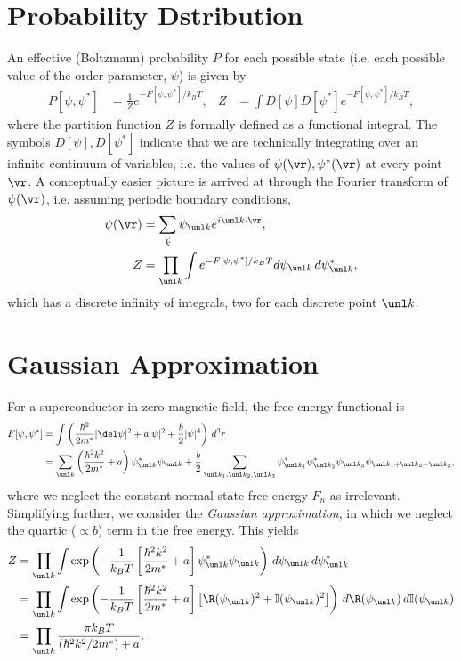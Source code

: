 \documentclass[qo.tex]{subfiles}
\begin{document}
\section{Probability Dstribution}
An effective (Boltzmann) probability $P$ for each possible state (i.e. each possible value of the order parameter, $\psi$) is given by
\begin{align}
    P[\psi,\psi^*] &= \frac{1}{Z}e^{-F[\psi,\psi^*]/k_BT}, & Z &= \int D[\psi]D[\psi^*]e^{-F[\psi,\psi^*]/k_BT},
\end{align}
where the partition function $Z$ is formally defined as a functional integral. 
The symbols $D[\psi],D[\psi^*]$ indicate that we are technically integrating over an infinite continuum of variables, i.e. the values of $\psi(\vr),\psi^*(\vr)$ at every point $\vr$.
A conceptually easier picture is arrived at through the Fourier transform of $\psi(\vr)$, i.e. assuming periodic boundary conditions,
\begin{align}
    \psi(\vr) &= \sum_{\vec{k}}\psi_{\vk}e^{i\vk\cdot\vr}, \\
    Z &= \prod_{\vk} \int e^{-F[\psi,\psi^*]/k_BT} d\psi_{\vk}\,d\psi^{*}_{\vk},
\end{align}
which has a discrete infinity of integrals, two for each discrete point $\vk$.

\section{Gaussian Approximation}
For a superconductor in zero magnetic field, the free energy functional is
\begin{align}
    F[\psi,\psi^*] &= \int \left(\frac{\hbar^2}{2m^*}|\del\psi|^2 + a|\psi|^2 + \frac{b}{2}|\psi|^4\right)\,d^3r \\
                   &= \sum_{\vk} \left(\frac{\hbar^2k^2}{2m^*}+a\right)\psi^*_{\vk}\psi_{\vk} + \frac{b}{2}\sum_{\vk_1,\vk_2,\vk_3} \psi^*_{\vk_1}\psi^*_{\vk_2}\psi_{\vk_3}\psi_{\vk_1+\vk_2-\vk_3},
\end{align}
where we neglect the constant normal state free energy $F_n$ as irrelevant.
Simplifying further, we consider the \emph{Gaussian approximation}, in which we neglect the quartic ($\propto b$) term in the free energy. 
This yields
\begin{align}
    \begin{split}
    Z &= \prod_{\vk}\int \exp\left(-\frac{1}{k_BT}\left[\frac{\hbar^2k^2}{2m^*}+a\right]\psi^*_{\vk}\psi_{\vk}\right)\,d\psi_{\vk}\,d\psi^*_{\vk} \\
      &= \prod_{\vk}\int \exp\left(-\frac{1}{k_BT}\left[\frac{\hbar^2k^2}{2m^*}+a\right]\left[\R(\psi_{\vk})^2+\mathbb{I}(\psi_{\vk})^2\right]\right)\,d\R(\psi_{\vk})\,d\mathbb{I}(\psi_{\vk}) \\
      &= \prod_{\vk}\frac{\pi k_BT}{(\hbar^2k^2/2m^*)+a}.
    \end{split}
\end{align}
\end{document}
